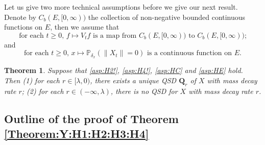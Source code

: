 \documentclass[12pt,a4paper]{amsart}
\numberwithin{equation}{section}
\theoremstyle{plain}
\newtheorem{thm}{Theorem}[section]
\theoremstyle{definition}
\theoremstyle{remark}
\begin{document}
	Let us give two more technical assumptions before we give our next result. Denote by $C_b(E,[0,\infty))$ the collection of non-negative bounded continuous functions on $E$, then we assume that
\begin{equation}
\label{asp:HC} \tag{H3}
	\text{for each $t\geq 0$, $f \mapsto V_tf$ is a map from $C_b(E, [0,\infty))$ to $C_b(E,[0,\infty))$;}
\end{equation}  
and
\begin{equation}
\label{asp:HE} \tag{H4}
	\text{for each $t\geq 0$, $x \mapsto \mathbb P_{\delta_x}( \|X_t \|=0)$ is a continuous function on $E$.}
\end{equation} 
\begin{thm} \label{thm:QSD}
	Suppose that \eqref{asp:H2!}, \eqref{asp:H4!}, \eqref{asp:HC} and \eqref{asp:HE} hold.
	Then (1) for each $r \in [\lambda, 0)$, there exists a unique QSD $\mathbf Q_r$ of $X$ with mass decay rate $r$;
	(2) for each $r\in (-\infty, \lambda)$, there is no QSD for $X$ with mass decay rate $r$. 
\end{thm}

\subsection{Outline of the proof of Theorem \ref{Theorem:Y:H1:H2:H3:H4}}
	\label{subsec:OY}
\end{document}
